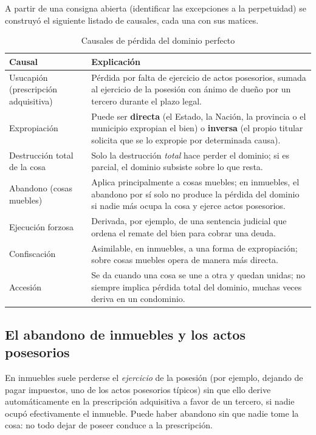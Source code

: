 \documentclass[12pt,oneside]{book}
\begin{document}
A partir de una consigna abierta (identificar las excepciones a la perpetuidad) se construyó el siguiente listado de causales, cada una con sus matices.

\begin{table}[H]
\centering
\caption{Causales de pérdida del dominio perfecto}
\renewcommand{\arraystretch}{1.2}
\begin{tabularx}{\textwidth}{>{\raggedright\arraybackslash}p{}>{\raggedright\arraybackslash}X}
\toprule
\textbf{Causal} & \textbf{Explicación} \\
\midrule
Usucapión (prescripción adquisitiva) & Pérdida por falta de ejercicio de actos posesorios, sumada al ejercicio de la posesión con ánimo de dueño por un tercero durante el plazo legal. \\
Expropiación & Puede ser \textbf{directa} (el Estado, la Nación, la provincia o el municipio expropian el bien) o \textbf{inversa} (el propio titular solicita que se lo expropie por determinada causa). \\
Destrucción total de la cosa & Solo la destrucción \emph{total} hace perder el dominio; si es parcial, el dominio subsiste sobre lo que resta. \\
Abandono (cosas muebles) & Aplica principalmente a cosas muebles; en inmuebles, el abandono por sí solo no produce la pérdida del dominio si nadie más ocupa la cosa y ejerce actos posesorios. \\
Ejecución forzosa & Derivada, por ejemplo, de una sentencia judicial que ordena el remate del bien para cobrar una deuda. \\
Confiscación & Asimilable, en inmuebles, a una forma de expropiación; sobre cosas muebles opera de manera más directa. \\
Accesión & Se da cuando una cosa se une a otra y quedan unidas; no siempre implica pérdida total del dominio, muchas veces deriva en un condominio. \\
\bottomrule
\end{tabularx}
\end{table}

\subsection{El abandono de inmuebles y los actos posesorios}

En inmuebles suele perderse el \emph{ejercicio} de la posesión (por ejemplo, dejando de pagar impuestos, uno de los actos posesorios típicos) sin que ello derive automáticamente en la prescripción adquisitiva a favor de un tercero, si nadie ocupó efectivamente el inmueble. Puede haber abandono sin que nadie tome la cosa: no todo dejar de poseer conduce a la prescripción.
\end{document}
